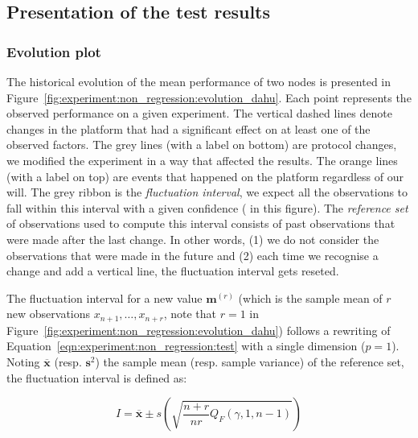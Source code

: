         \subsection{Presentation of the test results}%
        \label{sub:presentation_of_the_test_results}

            \subsubsection{Evolution plot}%

                The historical evolution of the mean performance of two nodes is presented in
                Figure~\ref{fig:experiment:non_regression:evolution_dahu}. Each point represents the observed
                performance on a given experiment. The vertical dashed lines denote changes in the platform that had a
                significant effect on at least one of the observed factors. The grey lines (with a label on bottom) are
                protocol changes, we modified the experiment in a way that affected the results. The orange lines (with
                a label on top) are events that happened on the platform regardless of our will.  The grey ribbon is the
                \emph{fluctuation interval}, we expect all the observations to fall within this interval with a given
                confidence ( in this figure). The \emph{reference set} of observations used to
                compute this interval consists of past observations that were made after the last change. In other
                words, (1) we do not consider the observations that were made in the future and (2) each time we
                recognise a change and add a vertical line, the fluctuation interval gets reseted.

                The fluctuation interval for a new value \(\bm{m}^{(r)}\) (which is the sample mean of \(r\) new
                observations \(x_{n+1},\dots,x_{n+r}\), note that \(r=1\) in
                Figure~\ref{fig:experiment:non_regression:evolution_dahu}) follows a rewriting of
                Equation~\ref{eqn:experiment:non_regression:test} with a single dimension (\(p=1\)). Noting
                \(\overline{\bm{x}}\) (resp. \(\bm{s}^2\)) the sample mean (resp. sample variance) of the reference set,
                the fluctuation interval is defined as:

                \begin{equation}\label{eqn:experiment:non_regression:interval}
                    I = \overline{\bm{x}} \pm s \left(\sqrt{\frac{n+r}{nr}Q_F(\gamma, 1, n-1)}\right)
                \end{equation}

